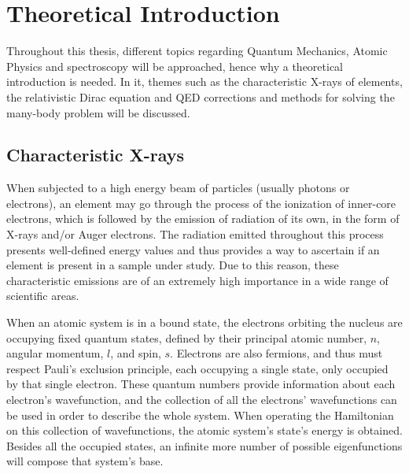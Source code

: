 
%
\listoftodos


\chapter{Theoretical Introduction}\label{cha:introduction}

Throughout this thesis, different topics regarding Quantum Mechanics, Atomic Physics and spectroscopy will be approached, hence why a theoretical introduction is needed. In it, themes such as the characteristic X-rays of elements, the relativistic Dirac equation and \gls{QED} corrections and methods for solving the many-body problem will be discussed.


\section{Characteristic X-rays}

When subjected to a high energy beam of particles (usually photons or electrons), an element may go through the process of the ionization of inner-core electrons, which is followed by the emission of radiation of its own, in the form of X-rays and/or Auger electrons. The radiation emitted throughout this process presents well-defined energy values and thus provides a way to ascertain if an element is present in a sample under study. Due to this reason, these characteristic emissions are of an extremely high importance in a wide range of scientific areas.



When an atomic system is in a bound state, the electrons orbiting the nucleus are occupying fixed quantum states, defined by their principal atomic number, $n$, angular momentum, $l$, and spin, $s$. Electrons are also fermions, and thus must respect Pauli's exclusion principle, each occupying a single state, only occupied by that single electron.
 These quantum numbers provide information about each electron's wavefunction, and the collection of all the electrons' wavefunctions can be used in order to describe the whole system. When operating the Hamiltonian on this collection of wavefunctions, the atomic system's state's energy is obtained.
Besides all the occupied states, an infinite more number of possible eigenfunctions will compose that system's base.

